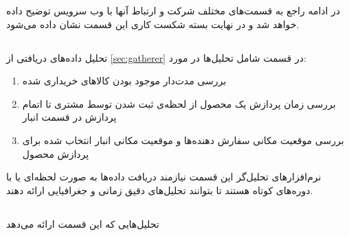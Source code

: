 در ادامه راجع به قسمت‌های مختلف شرکت و ارتباط آنها با وب سرویس توضیح داده خواهد شد و در نهایت بسته شکست کاری این قسمت نشان داده می‌شود.

\subsection{}\label{second-web-service:stock}
تحلیل‌ داده‌های دریافتی از 
\ref{sec:gatherer}
در قسمت 
شامل تحلیل‌ها در مورد:
\begin{enumerate}
\item\label{1}
بررسی مدت‌‌دار موجود بودن کالا‌های خریداری شده

\item\label{2}
بررسی زمان پردازش یک محصول از لحظه‌ی ثبت شدن توسط مشتری تا اتمام پردازش در قسمت انبار

\item\label{3}
بررسی موقعیت مکانی سفارش دهنده‌ها و موقعیت مکانی انبار انتخاب شده برای پردازش محصول

\end{enumerate}

نرم‌افزار‌های تحلیل‌گر این قسمت نیازمند دریافت داده‌ها به صورت لحظه‌ای یا با دوره‌های کوتاه هستند تا بتوانند تحلیل‌های دقیق زمانی و جغرافیایی ارائه دهند.

\subsection{}

تحلیل‌هایی که این قسمت ارائه می‌دهد
\subsection{}

